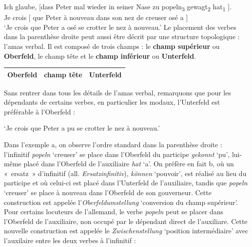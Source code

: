 {    \ea
    \gll  Ich glaube,   [dass Peter mal wieder in seiner Nase zu popeln\textsubscript{3} gewagt\textsubscript{2} hat\textsubscript{1}   ].\\
    Je crois   [ que  Peter à nouveau dans son nez   de creuser  osé        a   ]\\
    ‘Je crois que Peter a osé se crotter le nez à nouveau.’
    \z
    Le placement des verbes dans la parenthèse droite peut aussi être décrit par une structure topologique : l’amas verbal. Il est composé de trois champs : le \textbf{champ supérieur} ou \textbf{Oberfeld}, le champ tête et le \textbf{champ inférieur} ou \textbf{Unterfeld}.

    \begin{center}
    \def\arraystretch{1.5}
    \setlength{\tabcolsep}{4ex}
    \begin{tabular}{|c|c|c|}
    \hline
    Oberfeld & champ tête & Unterfeld\\
    \hline
    \end{tabular}
    \end{center}
    
    Sans rentrer dans tous les détails de l’amas verbal, remarquons que pour les dépendants de certains verbes, en particulier les modaux, l’Unterfeld est préférable à l’Oberfeld :

    \ea\label{ex:popel}
    \glt  ‘Je crois que Peter a pu se crotter le nez à nouveau.’
    \z
    \z

    Dans l’exemple a, on observe l’ordre standard dans la parenthèse droite : l’infinitif \textit{popeln} ‘creuser’ se place dans l’Oberfeld du participe \textit{gekonnt} ‘pu’, lui-même placé dans l’Oberfeld de l’auxiliaire \textit{hat} ‘a’. On préfère en fait b, où un «~ersatz~» d’infinitif (all. \textit{Ersatzinfinitiv}), \textit{können} ‘pouvoir’, est réalisé au lieu du participe et où celui-ci est placé dans l’Unterfeld de l’auxiliaire, tandis que \textit{popeln} ‘creuser’ se place à nouveau dans l’Oberfeld de son gouverneur. Cette construction est appelée l’\textit{Oberfeldumstellung} ‘conversion du champ supérieur’. Pour certains locuteurs de l’allemand, le verbe \textit{popeln} peut se placer dans l’Oberfeld de l’auxiliaire, non occupé par le dépendant direct de l’auxiliare. Cette nouvelle construction est appelée le \textit{Zwischenstellung} ‘position intermédiaire’ avec l’auxilaire entre les deux verbes à l’infinitif :

}
